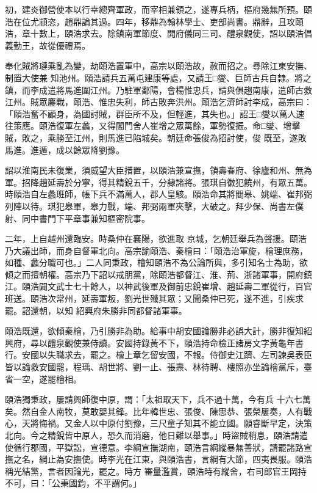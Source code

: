 \begin{pinyinscope}
 初，建炎御營使本以行幸總齊軍政，而宰相兼領之，遂專兵柄，樞府幾無所預。頤浩在位尤顓恣，趙鼎論其過。四年，移鼎為翰林學士、吏部尚書。鼎辭，且攻頤浩，章十數上，頤浩求去。除鎮南軍節度、開府儀同三司、醴泉觀使，詔以頤浩倡義勤王，故從優禮焉。



 奉化賊將璉乘亂為變，劫頤浩置軍中，高宗以頤浩故，赦而招之。尋除江東安撫、制置大使兼
 知池州。頤浩請兵五萬屯建康等處，又請王□燮、巨師古兵自隸。將之鎮，而李成遣將馬進圍江州。乃駐軍鄱陽，會楊惟忠兵，請與俱趨南康，遣師古救江州。賊眾鏖戰，頤浩、惟忠失利，師古敗奔洪州。頤浩乞濟師討李成，高宗曰：「頤浩奮不顧身，為國討賊，群臣所不及，但輕進，其失也。」詔王□燮以萬人速往策應。頤浩復軍左蠡，又得閣門舍人崔增之眾萬餘，軍勢復振。命□燮、增擊賊，敗之，乘勝至江州，則馬進已陷城矣。朝廷命張俊為招討使，俊
 既至，遂敗馬進。進遁，成以餘眾降劉豫。



 詔以淮南民未復業，須威望大臣措置，以頤浩兼宣撫，領壽春府、徐廬和州、無為軍。招降趙延壽於分寧，得其精銳五千，分隸諸將。張琪自徽犯饒州，有眾五萬。時頤浩自左蠡班師，帳下兵不滿萬人，郡人皇駭。頤浩命其將閻皋、姚端、崔邦弼列陣以待。琪犯皋軍，皋力戰，端、邦弼兩軍夾擊，大破之。拜少保、尚書左僕射、同中書門下平章事兼知樞密院事。



 二年，上自越州還臨安。時桑仲在襄陽，欲進取
 京城，乞朝廷舉兵為聲援。頤浩乃大議出師，而身自督軍北向。高宗諭頤浩、秦檜曰：「頤浩治軍旋，檜理庶務，如種、蠡分職可也。」二人同秉政，檜知頤浩不為公論所與，多引知名士為助，欲傾之而擅朝權。高宗乃下詔以戒朋黨，除頤浩都督江、淮、荊、浙諸軍事，開府鎮江。頤浩闢文武士七十餘人，以神武後軍及御前忠銳崔增、趙延壽二軍從行，百官班送。頤浩次常州，延壽軍叛，劉光世殲其眾；又聞桑仲已死，遂不進，引疾求罷。詔還朝，以知
 紹興府朱勝非同都督諸軍事。



 頤浩既還，欲傾秦檜，乃引勝非為助。給事中胡安國論勝非必誤大計，勝非復知紹興府，尋以醴泉觀使兼侍讀。安國持錄黃不下，頤浩持命檢正諸房文字黃龜年書行。安國以失職求去，罷之。檜上章乞留安國，不報。侍御史江躋、左司諫吳表臣皆以論救安國罷，程瑀、胡世將、劉一止、張燾、林待聘、樓照亦坐論檜黨斥，臺省一空，遂罷檜相。



 頤浩獨秉政，屢請興師復中原，謂：「太祖取天下，兵不過十萬，今有兵
 十六七萬矣。然自金人南牧，莫敢嬰其鋒。比年韓世忠、張俊、陳思恭、張榮屢奏，人有戰心，天將悔禍。又金人以中原付劉豫，三尺童子知其不能立國。願睿斷早定，決策北向。今之精銳皆中原人，恐久而消磨，他日難以舉事。」時盜賊稍息，頤浩請遣使循行郡國，平獄訟，宣德意。李綱宣撫湖南，頤浩言綱縱暴無善狀，請罷諸路宣撫之名，綱止為安撫使。時李光在江東，與頤浩書，言綱有大節，四夷畏服。頤浩稱光結黨，言者因論光，罷之。時方
 審量濫賞，頤浩時有縱舍，右司郎官王岡持不可，曰：「公秉國鈞，不平謂何。」




\end{pinyinscope}

